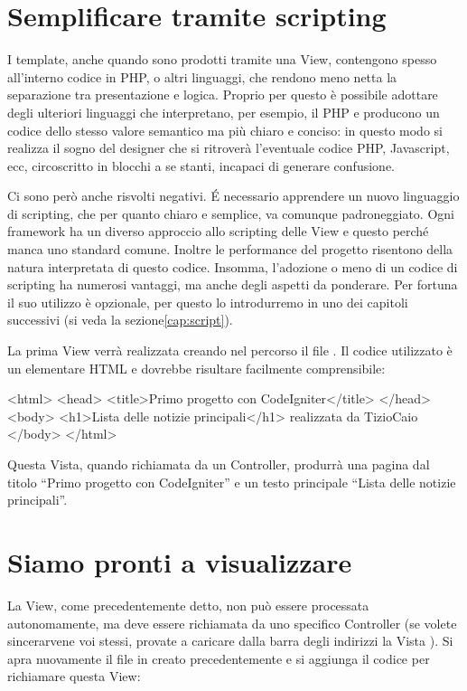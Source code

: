 \section*{Semplificare tramite scripting}
I template, anche quando sono prodotti tramite una View, contengono spesso all'interno codice in \ac{PHP}, o altri linguaggi, che rendono meno netta la separazione tra presentazione e logica. Proprio per questo è possibile adottare degli ulteriori linguaggi che interpretano, per esempio, il \ac{PHP} e producono un codice dello stesso valore semantico ma più chiaro e conciso: in questo modo si realizza il sogno del designer che si ritroverà l'eventuale codice \ac{PHP}, Javascript, ecc, circoscritto in blocchi a se stanti, incapaci di generare confusione.

Ci sono però anche risvolti negativi. \'E necessario apprendere un nuovo linguaggio di scripting, che per quanto chiaro e semplice, va comunque padroneggiato. Ogni framework ha un diverso approccio allo scripting delle View e questo perché manca uno standard comune. Inoltre le performance del progetto risentono della natura interpretata di questo codice. Insomma, l'adozione o meno di un codice di scripting ha numerosi vantaggi, ma anche degli aspetti da ponderare. Per fortuna il suo utilizzo è opzionale, per questo lo introdurremo in uno dei capitoli successivi (si veda la sezione\vref{cap:script}).

La prima View verrà realizzata creando nel percorso  il file . Il codice utilizzato è un elementare \ac{HTML} e dovrebbe risultare facilmente comprensibile:

\label{list:template}
\begin{html}
<html>
<head>
<title>Primo progetto con CodeIgniter</title>
</head>
<body>
<h1>Lista delle notizie principali</h1>
realizzata da TizioCaio
</body>
</html>
\end{html}

Questa Vista, quando richiamata da un Controller, produrrà una pagina dal titolo ``Primo progetto con CodeIgniter'' e un testo principale ``Lista delle notizie principali''.

\section*{Siamo pronti a visualizzare}
La View, come precedentemente detto, non può essere processata autonomamente, ma deve essere richiamata da uno specifico Controller (se volete sincerarvene voi stessi, provate a caricare dalla barra degli indirizzi la Vista ). Si apra nuovamente il file  in  creato precedentemente e si aggiunga il codice per richiamare questa View:

